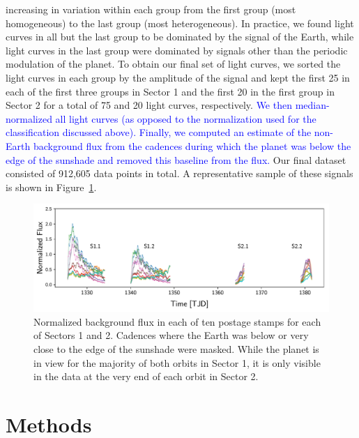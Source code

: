 \documentclass[modern]{aastex62}
\newcommand{\edited}[1]{\textcolor{blue}{#1}}
\begin{document}
increasing in variation within each group from the first group (most homogeneous) 
to the last group (most heterogeneous). In practice, we found light curves
in all but the last group to be dominated by 
the signal of the Earth, while light
curves in the last group were dominated by signals other than the
periodic modulation of the planet. To obtain our final set of light curves, 
we sorted the light curves in each group by the amplitude
of the signal and kept the first 25 in each of the first three groups in Sector 1
and the first 20 in the first group in Sector 2 for a total
of 75 and 20 light curves, respectively. 
\edited{%
We then median-normalized all light curves (as opposed to the
normalization used for the classification discussed above). Finally,
we computed an estimate of the
non-Earth background flux from the cadences during which the planet was below
the edge of the sunshade and removed this baseline from the flux.
}
Our final dataset consisted of 912,605 data points in total. 
A representative sample of these signals is shown in Figure~\ref{fig:data}.

\begin{figure}[t!]
    \begin{centering}
    \includegraphics[width=\linewidth]{figures/data.pdf}
    \caption{\label{fig:data}
             Normalized background flux in each of ten postage stamps
             for each of Sectors 1 and 2. Cadences where the Earth was
             below or very close to the edge of the sunshade were masked.
             While the planet is in view for the majority of both orbits
             in Sector 1, it is only visible in the data at the very end
             of each orbit in Sector 2.
             }
    \end{centering}
\end{figure}

\section{Methods}%
\label{sec:methods}%
%
\end{document}

